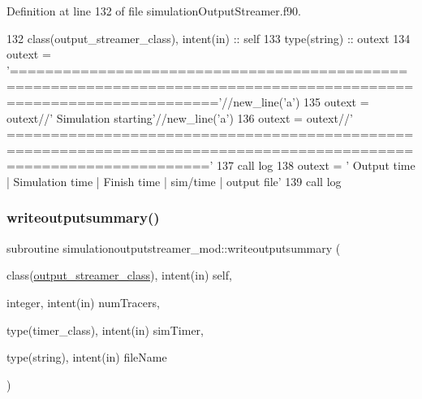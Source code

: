 Definition at line 132 of file simulation\+Output\+Streamer.\+f90.


\begin{DoxyCode}
132     \textcolor{keywordtype}{class}(output\_streamer\_class), \textcolor{keywordtype}{intent(in)} :: self
133     \textcolor{keywordtype}{type}(string) :: outext
134     outext =         \textcolor{stringliteral}{
      '==================================================================================================================='}//new\_line(\textcolor{stringliteral}{'a'})
135     outext = outext//\textcolor{stringliteral}{'                                             Simulation starting'}//new\_line(\textcolor{stringliteral}{'a'})
136     outext = outext//\textcolor{stringliteral}{'
       ==================================================================================================================='}
137     \textcolor{keyword}{call }log%
138     outext = \textcolor{stringliteral}{'    Output time    |   Simulation time   |      Finish time    |     %
       sim/time | output file'}
139     \textcolor{keyword}{call }log%
\end{DoxyCode}
\mbox{\label{namespacesimulationoutputstreamer__mod_a8b34c75e869c6409de7d6e5ceca5cca7}} 
\subsubsection{\texorpdfstring{writeoutputsummary()}{writeoutputsummary()}}
{\footnotesize\ttfamily subroutine simulationoutputstreamer\+\_\+mod\+::writeoutputsummary (\begin{DoxyParamCaption}\item[{class(\mbox{\hyperlink{structsimulationoutputstreamer__mod_1_1output__streamer__class}{output\+\_\+streamer\+\_\+class}}), intent(in)}]{self,  }\item[{integer, intent(in)}]{num\+Tracers,  }\item[{type(timer\+\_\+class), intent(in)}]{sim\+Timer,  }\item[{type(string), intent(in)}]{file\+Name }\end{DoxyParamCaption})\hspace{0.3cm}{\ttfamily [private]}}



